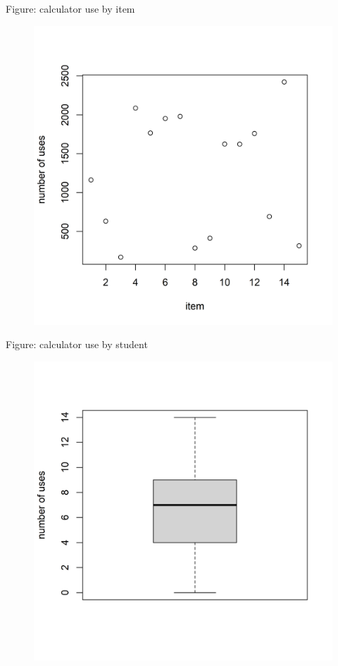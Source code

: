 \documentclass[xcolor=dvipsnames,12pt]{beamer}
\begin{document}
  \begin{frame}{Figure: calculator use by item}
    \begin{figure}
      \includegraphics[scale = 0.5]{figures/cal_use_by_item.png}
    \end{figure}
  \end{frame}

  \begin{frame}{Figure: calculator use by student}
    \begin{figure}
      \includegraphics[scale = 0.5]{figures/cal_use_by_person.png}
    \end{figure}
  \end{frame}
\end{document}
